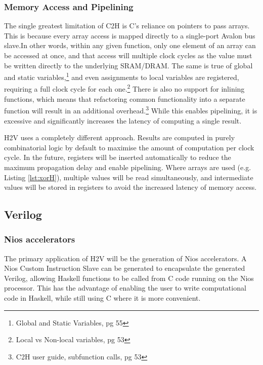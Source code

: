 \documentclass[english,onecolumn]{article}
\begin{document}
\subsubsection{Memory Access and Pipelining}
The single greatest limitation of C2H is C's reliance on pointers to pass arrays. This is because every array access is mapped directly to a single-port Avalon bus slave.\footnotemark In other words, within any given function, only one element of an array can be accessed at once, and that access will multiple clock cycles as the value must be written directly to the underlying SRAM/DRAM.
The same is true of global and static variables,\footnote{Global and Static Variables, pg 55} and even assignments to local variables are registered, requiring a full clock cycle for each one.\footnote{Local vs Non-local variables, pg 53}
There is also no support for inlining functions, which means that refactoring common functionality into a separate function will result in an additional overhead.\footnote{C2H user guide, subfunction calls, pg 53}
While this enables pipelining, it is excessive and significantly increases the latency of computing a single result.

H2V uses a completely different approach. Results are computed in purely combinatorial logic by default to maximise the amount of computation per clock cycle. In the future, registers will be inserted automatically to reduce the maximum propagation delay and enable pipelining. Where arrays are used (e.g. Listing \ref{lst:xorH}), multiple values will be read simultaneously, and intermediate values will be stored in registers to avoid the increased latency of memory access.

\subsection{Verilog}
\subsubsection{Nios accelerators}
The primary application of H2V will be the generation of Nios accelerators. A Nios Custom Instruction Slave can be generated to encapsulate the generated Verilog, allowing Haskell functions to be called from C code running on the Nios processor.
This has the advantage of enabling the user to write computational code in Haskell, while still using C where it is more convenient.
\end{document}
